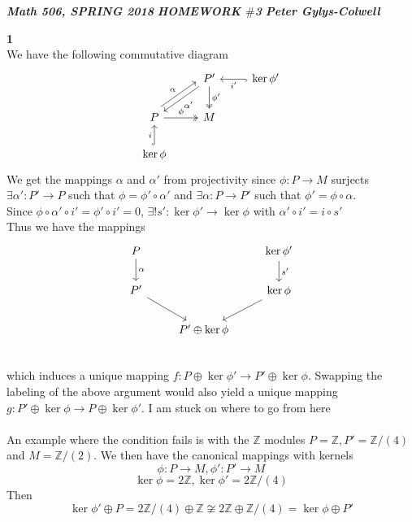 \documentclass[12pt]{article}
\newenvironment{ques}[1]{\textbf{#1}\vspace{1 mm}\\ }{\bigskip}
\theoremstyle{definition}
\newcommand{\Z}{\mathbb Z}
\renewcommand{\a}{\alpha}
\begin{document}
\noindent \textit{\textbf{Math 506, SPRING 2018}} \hspace{1.3cm}
\textit{\textbf{HOMEWORK $\#$3}} \hspace{1.3cm} \textit{\textbf{Peter
Gylys-Colwell}} 

\vspace{1cm}

\begin{ques}{1}
	We have the following commutative diagram
	$$\begin{tikzcd}
		 & P'\arrow[dl, "\a'"] \arrow[d, two heads, "\phi'"] &
		 \arrow[l, hook, "i'"] \ker \phi'\\
		 P \arrow[ur, shift left = 2, "\a"] \arrow[r, two heads, "\phi"] & M\\
		\arrow[u, hook, "i"] \ker \phi & & 
	\end{tikzcd}$$
	We get the mappings $\a$ and $\a'$ from projectivity since $\phi:P \to M$
	surjects $\exists \a':P' \to P$ such that $\phi = \phi' \circ \a'$ and
	$\exists \a:P \to P'$ such that $\phi' = \phi \circ \a$.\\
	Since $\phi\circ \a' \circ i' = \phi' \circ i' = 0$, $\exists! s': \ker
	\phi' \to \ker \phi$ with $\a' \circ i' = i \circ s'$\\
	Thus we have the mappings
	$$\begin{tikzcd}
		P\arrow[d, "\a"] & & \ker \phi'\arrow[d, "s'"]\\
		P' \arrow[dr] & & \arrow[dl]\ker \phi\\
		& P' \oplus \ker \phi& \\
	\end{tikzcd}$$
	which induces a unique mapping $f:P \oplus \ker \phi' \to P' \oplus \ker
	\phi$. Swapping the labeling of the above argument would also yield a
	unique mapping $g:P' \oplus \ker \phi \to P \oplus \ker \phi'$. I am stuck
	on where to go from here	\\
	\\
	An example where the condition fails is with the $\Z$ modules $P = \Z, P' =
	\Z/(4)$ and $M = \Z/(2)$. We then have the canonical mappings with kernels
	$$\phi:P \to M, \phi':P' \to M$$
	$$\ker \phi = 2\Z, \ker \phi' = 2\Z/(4)$$
	Then 
	$$\ker \phi' \oplus P = 2\Z/(4) \oplus \Z \not \cong 2\Z \oplus \Z/(4) =
	\ker \phi \oplus P'$$

\end{ques}
\end{document}
